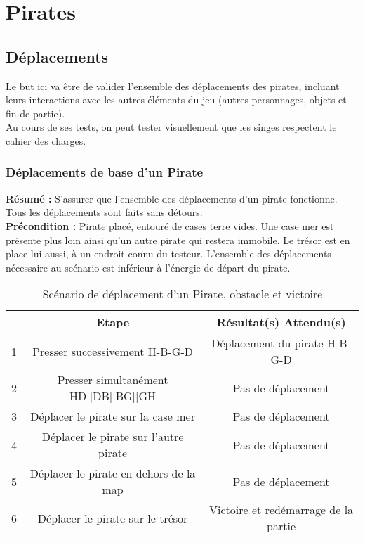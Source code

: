 %

\section{Pirates}
\label{sec:pirates}

\subsection{Déplacements}
\label{subsec:piratesDeplacements}

Le but ici va être de valider l'ensemble des déplacements des pirates, incluant leurs interactions avec les autres éléments du jeu (autres personnages, objets et fin de partie).\\
Au cours de ses tests, on peut tester visuellement que les singes respectent le cahier des charges.

\subsubsection{Déplacements de base d'un Pirate}\label{subsubsec:depBasePirate}
\textbf{Résumé :} S'assurer que l'ensemble des déplacements d'un pirate fonctionne. Tous les déplacements sont faits sans détours.\\
\textbf{Précondition :} Pirate placé, entouré de cases terre vides. Une case mer est présente plus loin ainsi qu'un autre pirate qui restera immobile. Le trésor est en place lui aussi, à un endroit connu du testeur. L'ensemble des déplacements nécessaire au scénario est inférieur à l'énergie de départ du pirate.
\begin{table}[!h]
	\begin{center}
		\begin{tabular}{|p{6pt}|c|c|}%
			\hline
			& \textbf{Etape} & \textbf{Résultat(s) Attendu(s)} \\\hline
			1 & Presser successivement H-B-G-D & Déplacement du pirate H-B-G-D  \\\hline
			2 & Presser simultanément HD||DB||BG||GH & Pas de déplacement \\\hline
			3 & Déplacer le pirate sur la case mer & Pas de déplacement \\\hline
			4 & Déplacer le pirate sur l'autre pirate & Pas de déplacement \\\hline
			5 & Déplacer le pirate en dehors de la map & Pas de déplacement \\\hline
			6 & Déplacer le pirate sur le trésor & Victoire et redémarrage de la partie \\\hline
		\end{tabular}
	\end{center}
	\caption{Scénario de déplacement d'un Pirate, obstacle et victoire}
\end{table}

